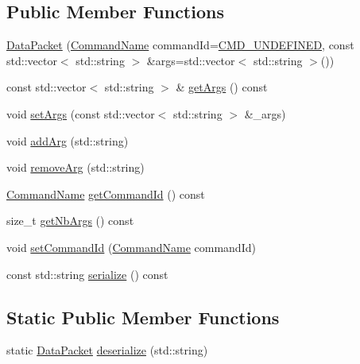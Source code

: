 \subsection*{Public Member Functions}
\begin{DoxyCompactItemize}
\item 
\mbox{\hyperlink{classbabel_1_1common_1_1_data_packet_a860ff3cd9e290b5b22efaf4f73c1cf1c}{Data\+Packet}} (\mbox{\hyperlink{namespacebabel_1_1common_a2d31f246c776da6bf656bd71e86cbb2c}{Command\+Name}} command\+Id=\mbox{\hyperlink{namespacebabel_1_1common_a2d31f246c776da6bf656bd71e86cbb2ca452461e4930e2af5d48e5d2f3eecf98f}{C\+M\+D\+\_\+\+U\+N\+D\+E\+F\+I\+N\+ED}}, const std\+::vector$<$ std\+::string $>$ \&args=std\+::vector$<$ std\+::string $>$())
\item 
const std\+::vector$<$ std\+::string $>$ \& \mbox{\hyperlink{classbabel_1_1common_1_1_data_packet_a9b5191cfb79290db7eea1a9b9aff3936}{get\+Args}} () const
\item 
void \mbox{\hyperlink{classbabel_1_1common_1_1_data_packet_aa81d00824a4e02c4800cb0f98a054527}{set\+Args}} (const std\+::vector$<$ std\+::string $>$ \&\+\_\+args)
\item 
void \mbox{\hyperlink{classbabel_1_1common_1_1_data_packet_a5fa7533d1b80455b7400286ecef769d2}{add\+Arg}} (std\+::string)
\item 
void \mbox{\hyperlink{classbabel_1_1common_1_1_data_packet_a809bfdee8aa18d067790b9d2672d1ab7}{remove\+Arg}} (std\+::string)
\item 
\mbox{\hyperlink{namespacebabel_1_1common_a2d31f246c776da6bf656bd71e86cbb2c}{Command\+Name}} \mbox{\hyperlink{classbabel_1_1common_1_1_data_packet_a70997898a38b52a810dcaab6e390e13b}{get\+Command\+Id}} () const
\item 
size\+\_\+t \mbox{\hyperlink{classbabel_1_1common_1_1_data_packet_ac931a547932857c13bbb641464d43422}{get\+Nb\+Args}} () const
\item 
void \mbox{\hyperlink{classbabel_1_1common_1_1_data_packet_ad156fb4f229df76b32fa8511eeb76b40}{set\+Command\+Id}} (\mbox{\hyperlink{namespacebabel_1_1common_a2d31f246c776da6bf656bd71e86cbb2c}{Command\+Name}} command\+Id)
\item 
const std\+::string \mbox{\hyperlink{classbabel_1_1common_1_1_data_packet_a5b7325b86634dfc305bcc102bfc95636}{serialize}} () const
\end{DoxyCompactItemize}
\subsection*{Static Public Member Functions}
\begin{DoxyCompactItemize}
\item 
static \mbox{\hyperlink{classbabel_1_1common_1_1_data_packet}{Data\+Packet}} \mbox{\hyperlink{classbabel_1_1common_1_1_data_packet_aeb93b2fb7ceaa5d78409808796a895f4}{deserialize}} (std\+::string)
\end{DoxyCompactItemize}


